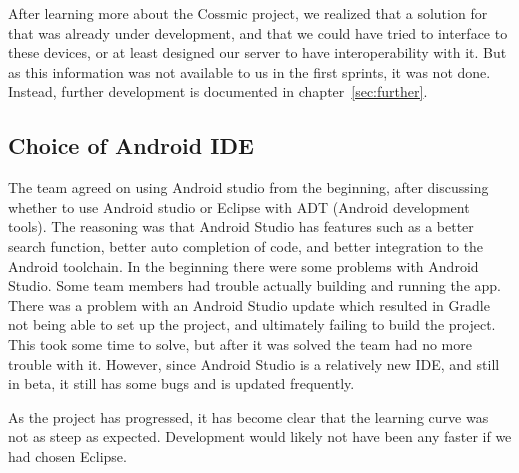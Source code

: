 After learning more about the Cossmic project, we realized that a solution for that was already under development, and that we could have tried to interface to these devices, or at least designed our server to have interoperability with it. But as this information was not available to us in the first sprints, it was not done. Instead, further development is documented in chapter~\ref{sec:further}.

\subsection{Choice of Android IDE}
The team agreed on using Android studio from the beginning, after discussing whether to use Android studio or Eclipse with ADT (Android development tools). The reasoning was that Android Studio has features such as a better search function, better auto completion of code, and better integration to the Android toolchain. In the beginning there were some problems with Android Studio. Some team members had trouble actually building and running the app. There was a problem with an Android Studio update which resulted in Gradle not being able to set up the project, and ultimately failing to build the project. This took some time to solve, but after it was solved the team had no more trouble with it. However, since Android Studio is a relatively new IDE, and still in beta, it still has some bugs and is updated frequently.

As the project has progressed, it has become clear that the learning curve was not as steep as expected. Development would likely not have been any faster if we had chosen Eclipse.

